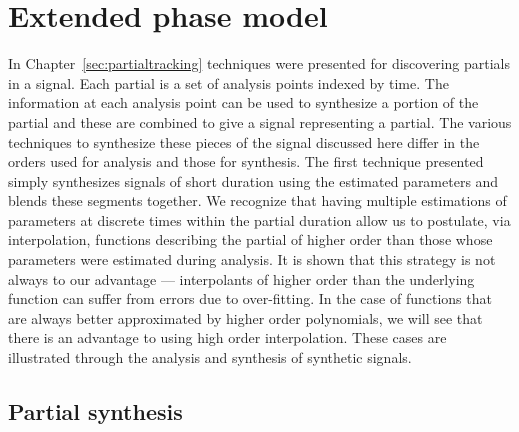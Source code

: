 \chapter{Extended phase model \label{chap:exphsmodel}}

In Chapter~\ref{sec:partialtracking} techniques were presented for discovering
partials in a signal. Each partial is a set of analysis points indexed by time.
The information at each analysis point can be used to synthesize a portion of
the partial and these are combined to give a signal representing a partial.
The various techniques to synthesize these pieces of the signal discussed here
differ in the orders used for analysis and those for synthesis. The first
technique presented simply synthesizes signals of short duration using the
estimated parameters and blends these segments together. We recognize that
having multiple estimations of parameters at discrete times within the partial
duration allow us to postulate, via interpolation, functions describing the
partial of higher order than those whose parameters were estimated during
analysis. It is shown that this strategy is not always to our advantage ---
interpolants of higher order than the underlying function can suffer from errors
due to over-fitting. In the case of functions that are always better
approximated by higher order polynomials, we will see that there is an advantage
to using high order interpolation. These cases are illustrated through the
analysis and synthesis of synthetic signals.

\section{Partial synthesis \label{sec:partialsynthesis}}

